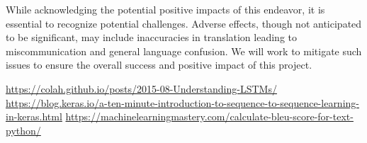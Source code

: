 \documentclass{article}
\begin{document}
While acknowledging the potential positive impacts of this endeavor, it is essential 
to recognize potential challenges. Adverse effects, though not anticipated to be 
significant, may include inaccuracies in translation leading to miscommunication and
general language confusion. We will work to mitigate such issues to ensure the 
overall success and positive impact of this project.

\begin{thebibliography}{100} %
 \url{https://colah.github.io/posts/2015-08-Understanding-LSTMs/}
 \url{https://blog.keras.io/a-ten-minute-introduction-to-sequence-to-sequence-learning-in-keras.html}
 \url{https://machinelearningmastery.com/calculate-bleu-score-for-text-python/}

\end{thebibliography}
\end{document}
